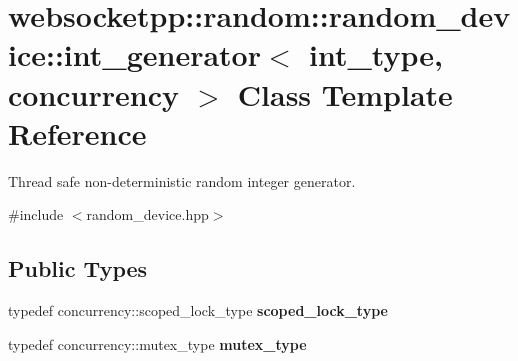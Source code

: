 \hypertarget{classwebsocketpp_1_1random_1_1random__device_1_1int__generator}{}\section{websocketpp\+:\+:random\+:\+:random\+\_\+device\+:\+:int\+\_\+generator$<$ int\+\_\+type, concurrency $>$ Class Template Reference}
\label{classwebsocketpp_1_1random_1_1random__device_1_1int__generator}


Thread safe non-\/deterministic random integer generator.  




{\ttfamily \#include $<$random\+\_\+device.\+hpp$>$}

\subsection*{Public Types}
\begin{DoxyCompactItemize}
\item 
\mbox{\label{classwebsocketpp_1_1random_1_1random__device_1_1int__generator_a7702456f8c753025bb52db190bfa04b3}} 
typedef concurrency\+::scoped\+\_\+lock\+\_\+type {\bfseries scoped\+\_\+lock\+\_\+type}
\item 
\mbox{\label{classwebsocketpp_1_1random_1_1random__device_1_1int__generator_a76479f1088f245508e7efce66b3ab51c}} 
typedef concurrency\+::mutex\+\_\+type {\bfseries mutex\+\_\+type}
\end{DoxyCompactItemize}
